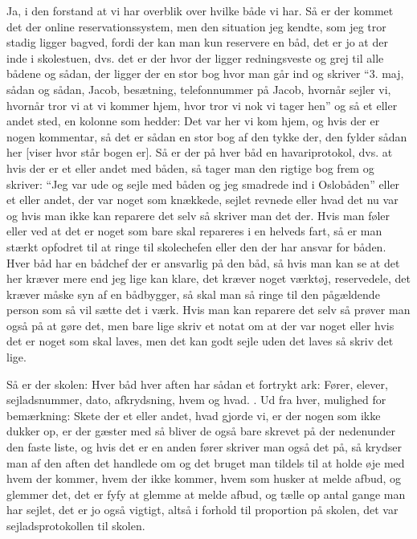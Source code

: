 Ja, i den forstand at vi har overblik over hvilke både vi har. 
Så er der kommet det der online reservationssystem, men den situation jeg kendte, som jeg tror stadig ligger bagved, fordi der kan man kun reservere en båd, det er jo at der inde i skolestuen, dvs. det er der hvor der ligger redningsveste og grej til alle bådene og sådan, der ligger der en stor bog hvor man går ind og skriver ``3. maj, sådan og sådan, Jacob, besætning, telefonnummer på Jacob, hvornår sejler vi, hvornår tror vi at vi kommer hjem, hvor tror vi nok vi tager hen'' og så et eller andet sted, en kolonne som hedder: Det var her vi kom hjem, og hvis der er nogen kommentar, så det er sådan en stor bog af den tykke der, den fylder sådan her [viser hvor står bogen er]. 
Så er der på hver båd en havariprotokol, dvs. at hvis der er et eller andet med båden, så tager man den rigtige bog frem og skriver: ``Jeg var ude og sejle med båden og jeg smadrede ind i Oslobåden'' eller et eller andet, der var noget som knækkede, sejlet revnede eller hvad det nu var og hvis man ikke kan reparere det selv så skriver man det der. 
Hvis man føler eller ved at det er noget som bare skal repareres i en helveds fart, så er man stærkt opfodret til at ringe til skolechefen eller den der har ansvar for båden. 
Hver båd har en bådchef der er ansvarlig på den båd, så hvis man kan se at det her kræver mere end jeg lige kan klare, det kræver noget værktøj, reservedele, det kræver måske syn af en bådbygger, så skal man så ringe til den pågældende person som så vil sætte det i værk. 
Hvis man kan reparere det selv så prøver man også på at gøre det, men bare lige skriv et notat om at der var noget eller hvis det er noget som skal laves, men det kan godt sejle uden det laves så skriv det lige. 

Så er der skolen: Hver båd hver aften har sådan et fortrykt ark: Fører, elever, sejladsnummer, dato, afkrydsning, hvem og hvad. 
. 
Ud fra hver, mulighed for bemærkning: Skete der et eller andet, hvad gjorde vi, er der nogen som ikke dukker op, er der gæster med så bliver de også bare skrevet på der nedenunder den faste liste, og hvis det er en anden fører skriver man også det på, så krydser man af den aften det handlede om og det bruget man tildels til at holde øje med hvem der kommer, hvem der ikke kommer, hvem som husker at melde afbud, og glemmer det, det er fyfy at glemme at melde afbud, og tælle op antal gange man har sejlet, det er jo også vigtigt, altså i forhold til proportion på skolen, det var sejladsprotokollen til skolen.

